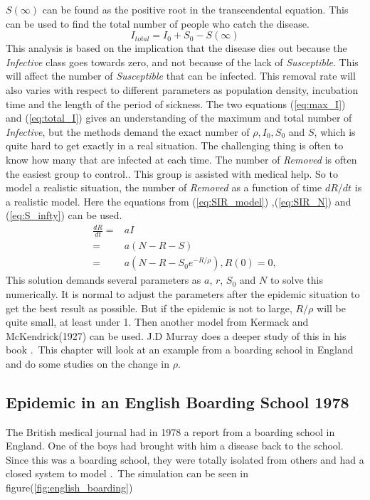 \documentclass[%
twoside,                 %
final,                   %
10pt]{article}
\begin{document}
$S(\infty)$ can be found as the positive root in the transcendental equation. This can be used to find the total number of people who catch the disease.
\begin{equation} \label{eq:total_I}
I_{total} = I_0 + S_0 -S(\infty)
\end{equation}
This analysis is based on the implication that the disease dies out because the \emph{Infective} class goes towards zero, and not because of the lack of \emph{Susceptible}. This will affect the number of \emph{Susceptible} that can be infected. This removal rate will also varies with respect to different parameters as population density, incubation time and the length of the period of sickness. The two equations (\ref{eq:max_I}) and (\ref{eq:total_I}) gives an understanding of the maximum and total number of \emph{Infective}, but the methods demand the exact number of $\rho,I_0,S_0$ and $S$, which is quite hard to get exactly in a real situation. The challenging thing is often to know how many that are infected at each time. The number of \emph{Removed} is often the easiest group to control.. This group is assisted with medical help. So to model a realistic situation, the number of \emph{Removed} as a function of time $dR/dt$ is a realistic model. Here the equations from (\ref{eq:SIR_model}) ,(\ref{eq:SIR_N}) and (\ref{eq:S_infty}) can be used.
\begin{equation} \label{eq:dR_normal}
	\begin{aligned} 
	\frac{dR}{dt} =& aI\\
	=& a(N-R-S)\\
	=& a(N-R-S_0e^{-R/\rho}), R(0)=0,
	\end{aligned}
\end{equation}
This solution demands several parameters as $a$, $r$, $S_0$ and $N$ to solve this numerically. It is normal to adjust the parameters after the epidemic situation to get the best result as possible. But if the epidemic is not to large, $R/\rho$ will be quite small, at least under 1. Then another model from Kermack and McKendrick(1927) can be used. J.D Murray does a deeper study of this in his book \cite[p.~324]{murray2002mathematical}.~This chapter will look at an example from a boarding school in England and do some studies on the change in $\rho$.  

\subsection{Epidemic in an English Boarding School 1978}
The British medical journal had in 1978 a report from a boarding school in England. One of the boys had brought with him a disease back to the school. Since this was a boarding school, they were totally isolated from others and had a closed system to model \cite[p.~325]{murray2002mathematical}.~The simulation can be seen in figure(\ref{fig:english_boarding})  
\end{document}
